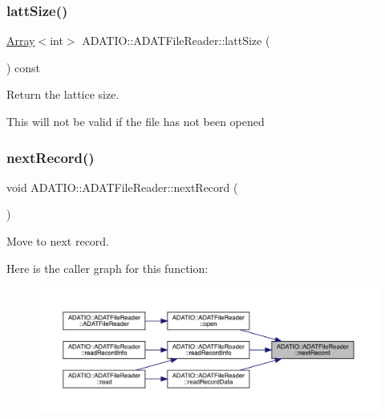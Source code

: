 \subsubsection{\texorpdfstring{lattSize()}{lattSize()}}
{\footnotesize\ttfamily \mbox{\hyperlink{classXMLArray_1_1Array}{Array}}$<$int$>$ A\+D\+A\+T\+I\+O\+::\+A\+D\+A\+T\+File\+Reader\+::latt\+Size (\begin{DoxyParamCaption}{ }\end{DoxyParamCaption}) const\hspace{0.3cm}{\ttfamily [inline]}}



Return the lattice size. 

This will not be valid if the file has not been opened \mbox{\label{group__qio_ga032651053fa6b2de6d3977f15862c48e}} 
\subsubsection{\texorpdfstring{nextRecord()}{nextRecord()}}
{\footnotesize\ttfamily void A\+D\+A\+T\+I\+O\+::\+A\+D\+A\+T\+File\+Reader\+::next\+Record (\begin{DoxyParamCaption}{ }\end{DoxyParamCaption})\hspace{0.3cm}{\ttfamily [protected]}}



Move to next record. 

Here is the caller graph for this function\+:\nopagebreak
\begin{figure}[H]
\begin{center}
\leavevmode
\includegraphics[width=350pt]{db/de5/group__qio_ga032651053fa6b2de6d3977f15862c48e_icgraph}
\end{center}
\end{figure}
\mbox{\label{group__qio_ga2b2ac967129dfd2d61a79e36034b400f}} 
